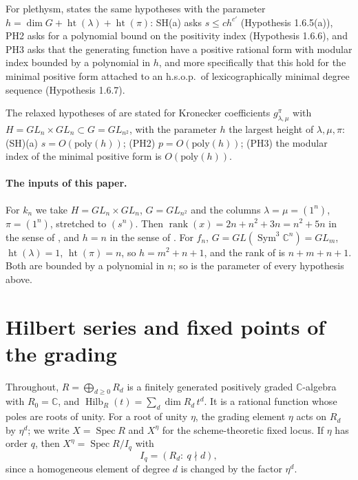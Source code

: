 \documentclass[11pt,a4paper]{article}
\theoremstyle{definition}
\newcommand{\C}{\mathbb{C}}
\newcommand{\Sym}{\operatorname{Sym}}
\newcommand{\Hilb}{\operatorname{Hilb}}
\newcommand{\Spec}{\operatorname{Spec}}
\newcommand{\rank}{\operatorname{rank}}
\begin{document}
For plethysm, \cite[Section 1.6, pp.~24--25]{GCT6} states the same hypotheses
with the parameter $h=\dim G+\operatorname{ht}(\lambda)+\operatorname{ht}(\pi)$:
SH(a) asks $s\le ch^{c'}$ (Hypothesis 1.6.5(a)), PH2 asks for a polynomial
bound on the positivity index (Hypothesis 1.6.6), and PH3 asks that the
generating function have a positive rational form with modular index bounded
by a polynomial in $h$, and more specifically that this hold for the minimal
positive form attached to an h.s.o.p.\ of lexicographically minimal degree
sequence (Hypothesis 1.6.7).

The relaxed hypotheses of \cite[Appendix, pp.~19--20]{BOR} are stated for
Kronecker coefficients $g_{\lambda,\mu}^{\pi}$ with $H=GL_n\times GL_n\subset
G=GL_{n^2}$, with the parameter $h$ the largest height of $\lambda,\mu,\pi$:
(SH)(a) $s=O(\mathrm{poly}(h))$; (PH2) $p=O(\mathrm{poly}(h))$; (PH3) the
modular index of the minimal positive form is $O(\mathrm{poly}(h))$.

\paragraph{The inputs of this paper.}
For $k_n$ we take $H=GL_n\times GL_n$, $G=GL_{n^2}$ and the columns
$\lambda=\mu=(1^n)$, $\pi=(1^n)$, stretched to $(s^n)$. Then $\rank(x)=2n+n^2+3n
=n^2+5n$ in the sense of \cite[Section 3.4]{GCT6}, and $h=n$ in the sense of
\cite[Appendix]{BOR}. For $f_n$, $G=GL(\Sym^3\C^n)=GL_m$, $\operatorname{ht}
(\lambda)=1$, $\operatorname{ht}(\pi)=n$, so $h=m^2+n+1$, and the rank of
\cite[Section 3.4]{GCT6} is $n+m+n+1$. Both are bounded by a polynomial in
$n$; so is the parameter of every hypothesis above.

\section{Hilbert series and fixed points of the grading}\label{sec:hilbert}

Throughout, $R=\bigoplus_{d\ge0}R_d$ is a finitely generated positively graded
$\C$-algebra with $R_0=\C$, and $\Hilb_R(t)=\sum_d\dim R_d\,t^d$. It is a
rational function whose poles are roots of unity. For a root of unity $\eta$,
the grading element $\eta$ acts on $R_d$ by $\eta^d$; we write $X=\Spec R$ and
$X^\eta$ for the scheme-theoretic fixed locus. If $\eta$ has order $q$, then
$X^\eta=\Spec R/I_q$ with
\begin{equation}\label{eq:fixedideal}
 I_q=(R_d:\ q\nmid d),
\end{equation}
since a homogeneous element of degree $d$ is changed by the factor $\eta^d$.
\end{document}
